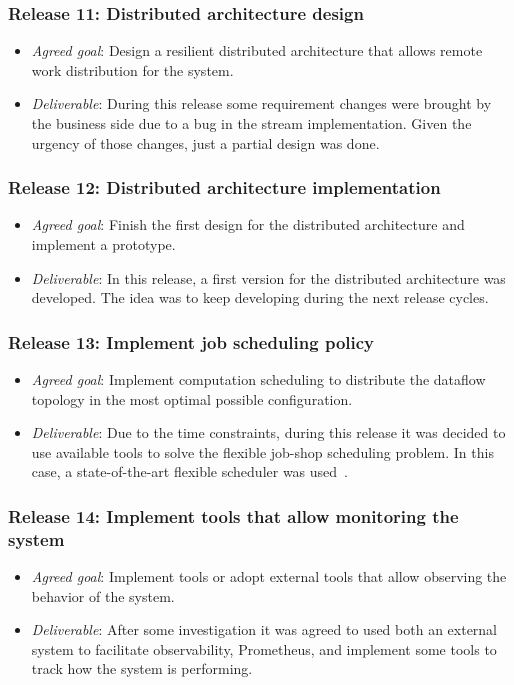 \subsubsection{Release 11: Distributed architecture design}
\begin{itemize}
\item \textit{Agreed goal}: Design a resilient distributed architecture that
  allows remote work distribution for the system.
\item \textit{Deliverable}: During this release some requirement changes were brought
  by the business side due to a bug in the stream implementation. Given the urgency
  of those changes, just a partial design was done.
\end{itemize}

\subsubsection{Release 12: Distributed architecture implementation}
\begin{itemize}
\item \textit{Agreed goal}: Finish the first design for the distributed
  architecture and implement a prototype.
\item \textit{Deliverable}: In this release, a first version for the distributed
  architecture was developed. The idea was to keep developing during the next
  release cycles.
\end{itemize}

\subsubsection{Release 13: Implement job scheduling policy}
\begin{itemize}
\item \textit{Agreed goal}: Implement computation scheduling to distribute the
  dataflow topology in the most optimal possible configuration.
\item \textit{Deliverable}: Due to the time constraints, during this release it
  was decided to use available tools to solve the flexible job-shop scheduling
  problem. In this case, a state-of-the-art flexible scheduler was used~\cite{firmament}.
\end{itemize}

\subsubsection{Release 14: Implement tools that allow monitoring the system}
\begin{itemize}
\item \textit{Agreed goal}: Implement tools or adopt external tools that allow
  observing the behavior of the system.
\item \textit{Deliverable}: After some investigation it was agreed to used both
  an external system to facilitate observability, Prometheus, and implement some
  tools to track how the system is performing.
\end{itemize}

